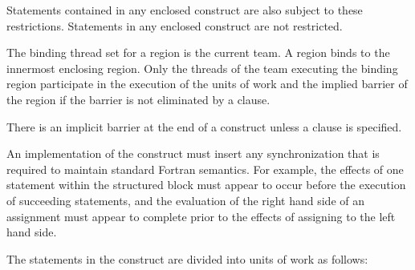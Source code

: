 Statements contained in any enclosed  construct are also subject to these 
restrictions. Statements in any enclosed  construct are not restricted.

\binding
The binding thread set for a  region is the current team. A  
region binds to the innermost enclosing  region. Only the threads of the team 
executing the binding  region participate in the execution of the units of 
work and the implied barrier of the  region if the barrier is not eliminated 
by a  clause.

\descr
There is an implicit barrier at the end of a  construct unless a  
clause is specified.

\begin{figure}[t!]
\end{figure}

An implementation of the  construct must insert any synchronization that is 
required to maintain standard Fortran semantics. For example, the effects of one 
statement within the structured block must appear to occur before the execution of 
succeeding statements, and the evaluation of the right hand side of an assignment must 
appear to complete prior to the effects of assigning to the left hand side.

The statements in the  construct are divided into units of work as follows:

